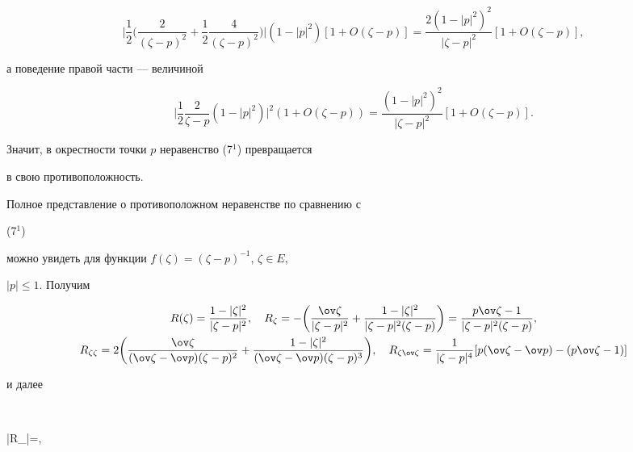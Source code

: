 $$ 


\bigg|\frac{1}{2}\bigg(\frac{2}{(\zeta-p)^2} 


+\frac{1}{2}\frac{4}{(\zeta-p)^2}\bigg)\bigg| 


(1-|p|^2)[1+O(\zeta-p)]=\frac{2(1-|p|^2)^2}{|\zeta-p|^2} 


[1+O(\zeta-p)], 


$$ 


а поведение правой части --- величиной 


$$ 


\bigg|\frac{1}{2}\frac{2}{\zeta-p}(1-|p|^2)\bigg|^2 


(1+O(\zeta-p))=\frac{(1-|p|^2)^2}{|\zeta-p|^2}[1+O(\zeta-p)]. 


$$ 


Значит, в окрестности точки $p$ неравенство (7${}^1$) превращается 


в свою противоположность. 


 


Полное представление о противоположном неравенстве по сравнению с 


(7${}^1$) 


можно увидеть для функции $f(\zeta)=(\zeta-p)^{-1}$, $\zeta\in E$, 


$|p|\le1$. Получим 


\begin{gather*} 


R(\zeta)=\frac{1-|\zeta|^2}{|\zeta-p|^2},\quad 


R_\zeta=-\bigg(\frac{\ov\zeta}{|\zeta-p|^2}+ 


\frac{1-|\zeta|^2}{|\zeta-p|^2(\zeta-p)}\bigg)= 


\frac{p\ov\zeta-1}{|\zeta-p|^2(\zeta-p)},\\ 


% 


R_{\zeta\zeta}=2\bigg(\frac{\ov\zeta}{(\ov\zeta-\ov p)(\zeta-p)^2} 


+\frac{1-|\zeta|^2}{(\ov\zeta-\ov p)(\zeta-p)^3}\bigg),\quad 


R_{\zeta\ov\zeta}=\frac{1}{|\zeta-p|^4} 


[p(\ov\zeta-\ov p)-(p\ov\zeta-1)] 


\end{gather*} 


и далее 


$$ 


|R_{\zeta\zeta}|=,\quad 


